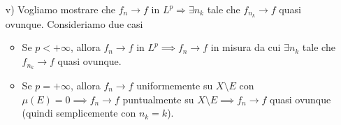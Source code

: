 \begin{enumerate}
\item[v)] Vogliamo mostrare che $f_n \to f$ in $L^p \Rightarrow \exists n_k$ tale che $f_{n_k} \to f$ quasi ovunque. Consideriamo due casi
	\begin{itemize}
		\item Se $p < +\infty$, allora $f_n \to f$ in $L^p \implies f_n \to f$ in misura da cui $\exists n_k$ tale che $f_{n_k} \to f$ quasi ovunque.

		\item Se $p = +\infty$, allora $f_n \to f$ uniformemente su $X \setminus E$ con $\mu(E) = 0 \implies f_n \to f$ puntualmente su $X \setminus E \implies f_n \to f$ quasi ovunque (quindi semplicemente con $n_k = k$). 
	\end{itemize}

\end{enumerate}

